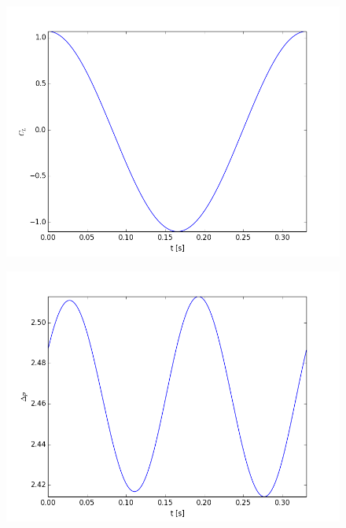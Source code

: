 \documentclass[a4paper,english,11pt,twoside]{article}
\begin{document}
\begin{figure}[h!]
\includegraphics[scale=0.7]{2b_figure_2.png}
\end{figure}
\begin{figure}[h!]
\includegraphics[scale=0.7]{2b_figure_3.png}
\end{figure}\\

\newpage
\end{document}
